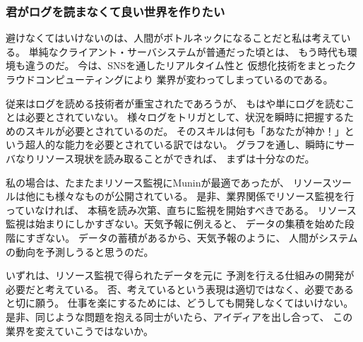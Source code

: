 \subsubsection{君がログを読まなくて良い世界を作りたい}
避けなくてはいけないのは、人間がボトルネックになることだと私は考えている。
単純なクライアント・サーバシステムが普通だった頃とは、
もう時代も環境も違うのだ。
今は、SNSを通したリアルタイム性と
仮想化技術をまとったクラウドコンピューティングにより
業界が変わってしまっているのである。

従来はログを読める技術者が重宝されたであろうが、
もはや単にログを読むことは必要とされていない。
様々ログをトリガとして、状況を瞬時に把握するためのスキルが必要とされているのだ。
そのスキルは何も「あなたが神か！」という超人的な能力を必要とされている訳ではない。
グラフを通し、瞬時にサーバなりリソース現状を読み取ることができれば、
まずは十分なのだ。

私の場合は、たまたまリソース監視にMuninが最適であったが、
リソースツールは他にも様々なものが公開されている。
是非、業界関係でリソース監視を行っていなければ、
本稿を読み次第、直ちに監視を開始すべきである。
リソース監視は始まりにしかすぎない。天気予報に例えると、
データの集積を始めた段階にすぎない。
データの蓄積があるから、天気予報のように、
人間がシステムの動向を予測しうると思うのだ。

いずれは、リソース監視で得られたデータを元に
予測を行える仕組みの開発が必要だと考えている。
否、考えているという表現は適切ではなく、必要であると切に願う。
仕事を楽にするためには、どうしても開発しなくてはいけない。
是非、同じような問題を抱える同士がいたら、アイディアを出し合って、
この業界を変えていこうではないか。


